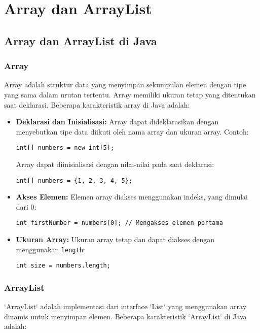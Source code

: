 \chapter{Array dan ArrayList}

\section{Array dan ArrayList di Java}

\subsection{Array}

Array adalah struktur data yang menyimpan sekumpulan elemen dengan tipe yang sama dalam urutan tertentu. Array memiliki ukuran tetap yang ditentukan saat deklarasi. Beberapa karakteristik array di Java adalah:

\begin{itemize}
	\item \textbf{Deklarasi dan Inisialisasi:} Array dapat dideklarasikan dengan menyebutkan tipe data diikuti oleh nama array dan ukuran array. Contoh:
	\begin{lstlisting}[style=JavaStyle]
		int[] numbers = new int[5];
	\end{lstlisting}
	Array dapat diinisialisasi dengan nilai-nilai pada saat deklarasi:
	\begin{lstlisting}[style=JavaStyle]
		int[] numbers = {1, 2, 3, 4, 5};
	\end{lstlisting}
	\item \textbf{Akses Elemen:} Elemen array diakses menggunakan indeks, yang dimulai dari 0:
	\begin{lstlisting}[style=JavaStyle]
		int firstNumber = numbers[0]; // Mengakses elemen pertama
	\end{lstlisting}
	\item \textbf{Ukuran Array:} Ukuran array tetap dan dapat diakses dengan menggunakan \texttt{length}:
	\begin{lstlisting}[style=JavaStyle]
		int size = numbers.length;
	\end{lstlisting}
\end{itemize}

\subsection{ArrayList}

`ArrayList` adalah implementasi dari interface `List` yang menggunakan array dinamis untuk menyimpan elemen. Beberapa karakteristik `ArrayList` di Java adalah:

